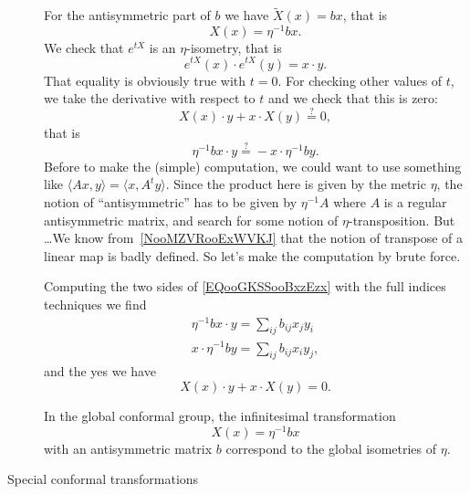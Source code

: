 \begin{description}
		For the antisymmetric part of \(b\)  we have \( \tilde X(x)=bx\), that is
		\begin{equation}
			X(x)=\eta^{-1}bx.
		\end{equation}
		We check that \(  e^{tX}\) is an \( \eta\)-isometry, that is
		\begin{equation}
			e^{tX}(x)\cdot  e^{tX}(y)=x\cdot y.
		\end{equation}
		That equality is obviously true with \( t=0\). For checking other values of \( t\), we take the derivative with respect to \( t\) and we check that this is zero:
		\begin{equation}
			X(x)\cdot y+x\cdot X(y)\stackrel{?}{=}0,
		\end{equation}
		that is
		\begin{equation}    \label{EQooGKSSooBxzEzx}
			\eta^{-1}bx\cdot y\stackrel{?}{=}-x\cdot \eta^{-1}by.
		\end{equation}
		Before to make the (simple) computation, we could want to use something like \( \langle Ax, y\rangle =\langle x, A^ty\rangle \). Since the product here is given by the metric \( \eta\), the notion of ``antisymmetric'' has to be given by \( \eta^{-1}A\) where \( A\) is a regular antisymmetric matrix, and search for some notion of \( \eta\)-transposition. But \ldots We know from~\ref{NooMZVRooExWVKJ} that the notion of transpose of a linear map is badly defined. So let's make the computation by brute force.

		Computing the two sides of \eqref{EQooGKSSooBxzEzx} with the full indices techniques we find
		\begin{subequations}
			\begin{align}
				\eta^{-1}bx\cdot y=\sum_{ij}b_{ij}x_jy_i \\
				x\cdot \eta^{-1}by=\sum_{ij}b_{ij}x_iy_j,
			\end{align}
		\end{subequations}
		and the yes we have
		\begin{equation}
			X(x)\cdot y+x\cdot X(y)=0.
		\end{equation}

		In the global conformal group, the infinitesimal transformation
		\begin{equation}
			X(x)=\eta^{-1}bx
		\end{equation}
		with an antisymmetric matrix \( b\) correspond to the global isometries of \( \eta\).

	\item[Special conformal transformations]


\end{description}
